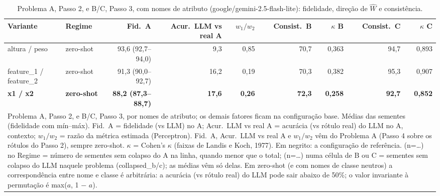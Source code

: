 \begin{table}[htbp]
\centering
\small
\caption{Problema A, Passo 2, e B/C, Passo 3, com nomes de atributo (google/gemini-2.5-flash-lite): fidelidade, direção de $\hat{W}$ e consistência.}
\label{tab:bloco1_vies_nomes_atributo_flashlite}
\begin{tabular}{llrrrrrrr}
\toprule
Variante & Regime & Fid.\ A & Acur.\ LLM vs real A & $w_1/w_2$ & Consist.\ B & $\kappa$ B & Consist.\ C & $\kappa$ C \\
\midrule
altura / peso & zero-shot & 93,6 (92,7–94,0) & 9,3 & 0,85 & 70,7 & 0,363 & 94,7 & 0,893 \\
feature\_1 / feature\_2 & zero-shot & 91,3 (90,0–92,7) & 16,2 & 0,19 & 70,3 & 0,382 & 95,3 & 0,907 \\
\textbf{x1 / x2} & \textbf{zero-shot} & \textbf{88,2 (87,3–88,7)} & \textbf{17,6} & \textbf{0,26} & \textbf{72,3} & \textbf{0,258} & \textbf{92,7} & \textbf{0,852} \\
\bottomrule
\multicolumn{9}{p{0.95\linewidth}}{\footnotesize Problema A, Passo 2, e B/C, Passo 3, por nomes de atributo; os demais fatores ficam na configuração base. Médias das sementes (fidelidade com mín–máx). Fid.\ A = fidelidade (vs LLM) no A; Acur.\ LLM vs real A = acurácia (vs rótulo real) do LLM no A, contexto; $w_1/w_2$ = razão da métrica estimada (Perceptron). Fid.\ A, Acur.\ LLM vs real A e $w_1/w_2$ vêm do Problema A (Passo 4 sobre os rótulos do Passo 2), sempre zero-shot. $\kappa$ = Cohen's $\kappa$ (faixas de Landis e Koch, 1977). Em negrito: a configuração de referência. (n=…) no Regime = número de sementes sem colapso do A na linha, quando menor que o total; (n=…) numa célula de B ou C = sementes sem colapso do LLM naquele problema (collapsed\_b/c); as médias vêm só delas. Em zero-shot (e com nomes de classe neutros) a correspondência entre nome e classe é arbitrária: a acurácia (vs rótulo real) do LLM pode sair abaixo de 50\%; o valor invariante à permutação é max($a$, 1 $-$ $a$).} \\
\end{tabular}
\end{table}
